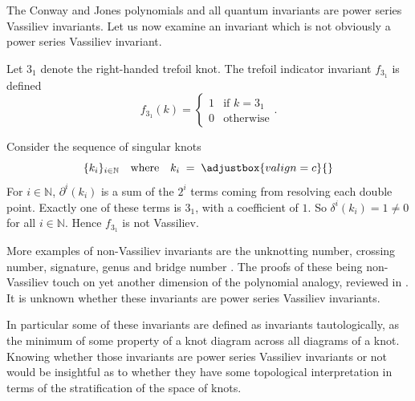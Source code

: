 The Conway and Jones polynomials and all quantum invariants \cite{knot-polynomials-and-vassilievs-invariants} are power series Vassiliev invariants. Let us now examine an invariant which is not obviously a power series Vassiliev invariant.
\begin{example}
	\label{ex:trefoil-indicator}
	Let \(3_{1}\) denote the right-handed trefoil knot. 
	The trefoil indicator invariant \(f_{3_{1}}\) is defined
	\[
		f_{3_{1}}(k)
		=
		\begin{cases}
			1
			& \text{if \(k = 3_{1}\)} \\
			0
			& \text{otherwise}
		\end{cases}
		.
	\]

	Consider the sequence of singular knots
	\[
		\{k_{i}\}_{i \in \mathbb{N}}
		\quad
		\text{where}
		\quad
		k_{i}
		\;
		=
		\;
		\def\svgscale{0.3}
		\adjustbox{valign=c}{}
	\]
	For \(i \in \mathbb{N}\), \(\partial^{i}(k_{i})\) is a sum of the \(2^{i}\) terms coming from resolving each double point. Exactly one of these terms is \(3_{1}\), with a coefficient of \(1\). So \(\delta^{i}(k_{i}) = 1 \neq 0\) for all \(i \in \mathbb{N}\). Hence \(f_{3_{1}}\) is not Vassiliev.
\end{example}

More examples of non-Vassiliev invariants are the unknotting number, crossing number, signature, genus and bridge number \cite{many-classical-knot-invariants-are-not-vassiliev-invariants, twist-sequnces-and-vassiliev-invariants}. The proofs of these being non-Vassiliev touch on yet another dimension of the polynomial analogy, reviewed in \cite{vassiliev-invariants-as-polynomials}. It is unknown whether these invariants are power series Vassiliev invariants. 

In particular some of these invariants are defined as invariants tautologically, as the minimum of some property of a knot diagram across all diagrams of a knot. Knowing whether those invariants are power series Vassiliev invariants or not would be insightful as to whether they have some topological interpretation in terms of the stratification of the space of knots.

